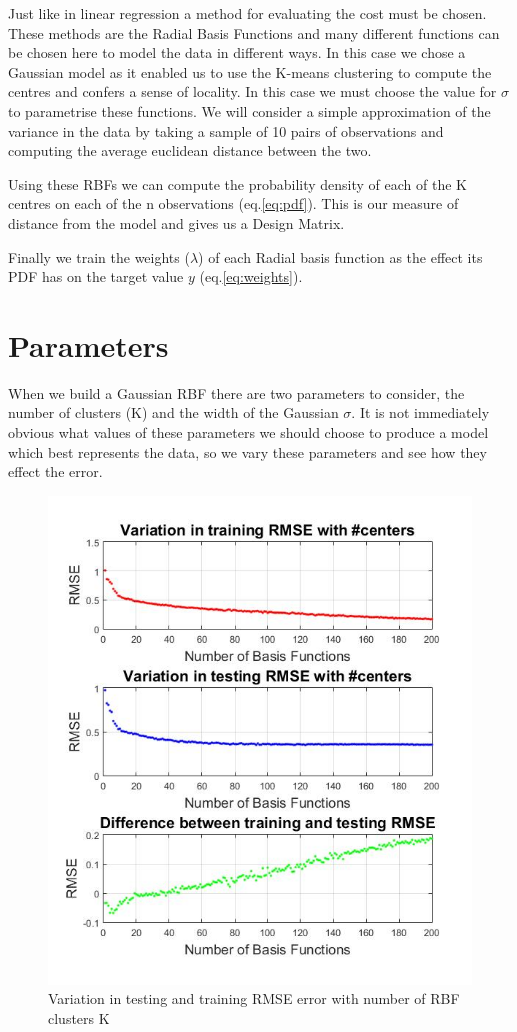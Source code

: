 \documentclass[a4paper,11pt, twocolumn]{article}
\begin{document}
Just like in linear regression a method for evaluating the cost must be chosen. These methods are the Radial Basis Functions and many different functions can be chosen here to model the data in different ways. In this case we chose a Gaussian model as it enabled us to use the K-means clustering to compute the centres and confers a sense of locality. In this case we must choose the value for $\sigma$ to parametrise these functions. We will consider a simple approximation of the variance in the data by taking a sample of 10 pairs of observations and computing the average euclidean distance between the two. 

Using these RBFs we can compute the probability density of each of the K centres on each of the n observations (eq.\ref{eq:pdf}). This is our measure of distance from the model and gives us a Design Matrix. 

Finally we train the weights ($\lambda$) of each Radial basis function as the effect its PDF has on the target value $y$ (eq.\ref{eq:weights}).
\section{Parameters}
When we build a Gaussian RBF there are two parameters to consider, the number of clusters (K) and the width of the Gaussian $\sigma$. It is not immediately obvious what values of these parameters we should choose to produce a model which best represents the data, so we vary these parameters and see how they effect the error. 

\begin{figure}[ht]
	\includegraphics[width=\linewidth]{VaryingK.jpg}
	\centering
	\caption{Variation in testing and training RMSE error with number of RBF clusters K}
		\label{fig:VaryingK}
\end{figure}
\end{document}
